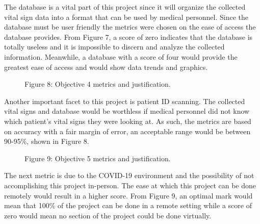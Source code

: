 ﻿\documentclass[10pt]{article}
\begin{document}
The database is a vital part of this project since it will organize the collected vital sign data into a format that can be used by medical personnel. Since the database must be user friendly the metrics were chosen on the ease of access the database provides. From Figure 7, a score of zero indicates that the database is totally useless and it is impossible to discern and analyze the collected information. Meanwhile, a database with a score of four would provide the greatest ease of access and would show data trends and graphics. 
%
%	
\begin{figure}
\caption{Figure 8: Objective 4 metrics and justification.}
\label{fig:8}
\end{figure}

Another important facet to this project is patient ID scanning. The collected vital signs and database would be worthless if medical personnel did not know which patient’s vital signs they were looking at. As such, the metrics are based on accuracy with a fair margin of error, an acceptable range would be between 90-95\%, shown in Figure 8. 

%
%	
\begin{figure}
\caption{Figure 9: Objective 5 metrics and justification.}
\label{fig:9}
\end{figure}

The next metric is due to the COVID-19 environment and the possibility of not accomplishing this project in-person. The ease at which this project can be done remotely would result in a higher score. From Figure 9, an optimal mark would mean that 100\% of the project can be done in a remote setting while a score of zero would mean no section of the project could be done virtually. 
\end{document}
